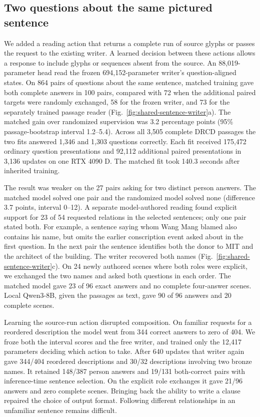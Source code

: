 \subsection*{Two questions about the same pictured sentence}
We added a reading action that returns a complete run of source glyphs or passes the request to the existing writer. A learned decision between these actions allows a response to include glyphs or sequences absent from the source. An 88,019-parameter head read the frozen 694,152-parameter writer's question-aligned states. On 864 pairs of questions about the same sentence, matched training gave both complete answers in 100 pairs, compared with 72 when the additional paired targets were randomly exchanged, 58 for the frozen writer, and 73 for the separately trained passage reader (Fig.~\ref{fig:shared-sentence-writer}a). The matched gain over randomized supervision was 3.2 percentage points (95\% passage-bootstrap interval 1.2--5.4). Across all 3,505 complete DRCD passages the two fits answered 1,346 and 1,303 questions correctly. Each fit received 175,472 ordinary question presentations and 92,112 additional paired presentations in 3,136 updates on one RTX 4090 D. The matched fit took 140.3 seconds after inherited training.

The result was weaker on the 27 pairs asking for two distinct person answers. The matched model solved one pair and the randomized model solved none (difference 3.7 points, interval 0--12). A separate model-authored reading found explicit support for 23 of 54 requested relations in the selected sentences; only one pair stated both. For example, a sentence saying whom Wang Mang blamed also contains his name, but omits the earlier conscription event asked about in the first question. In the next pair the sentence identifies both the donor to MIT and the architect of the building. The writer recovered both names (Fig.~\ref{fig:shared-sentence-writer}c). On 24 newly authored scenes where both roles were explicit, we exchanged the two names and asked both questions in each order. The matched model gave 23 of 96 exact answers and no complete four-answer scenes. Local Qwen3-8B, given the passages as text, gave 90 of 96 answers and 20 complete scenes.

Learning the source-run action disrupted composition. On familiar requests for a reordered description the model went from 344 correct answers to zero of 404. We froze both the interval scores and the free writer, and trained only the 12,417 parameters deciding which action to take. After 640 updates that writer again gave 344/404 reordered descriptions and 30/32 descriptions involving two bronze names. It retained 148/387 person answers and 19/131 both-correct pairs with inference-time sentence selection. On the explicit role exchanges it gave 21/96 answers and zero complete scenes. Bringing back the ability to write a clause repaired the choice of output format. Following different relationships in an unfamiliar sentence remains difficult.
